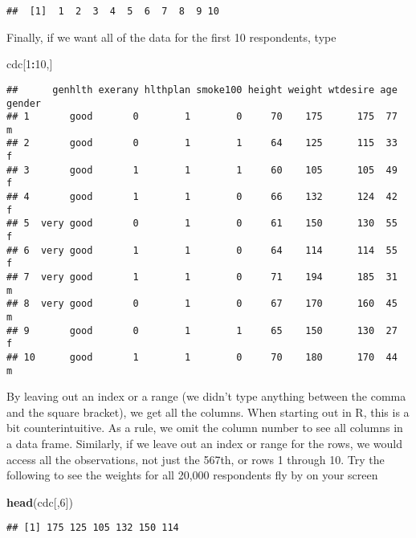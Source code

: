 \documentclass[]{article}
\newenvironment{Shaded}{\begin{snugshade}}{\end{snugshade}}
\newcommand{\KeywordTok}[1]{\textcolor[rgb]{0.13,0.29,0.53}{\textbf{#1}}}
\newcommand{\DecValTok}[1]{\textcolor[rgb]{0.00,0.00,0.81}{#1}}
\newcommand{\OperatorTok}[1]{\textcolor[rgb]{0.81,0.36,0.00}{\textbf{#1}}}
\newcommand{\NormalTok}[1]{#1}
\begin{document}
\begin{verbatim}
##  [1]  1  2  3  4  5  6  7  8  9 10
\end{verbatim}

Finally, if we want all of the data for the first 10 respondents, type

\begin{Shaded}
\begin{Highlighting}[]
\NormalTok{cdc[}\DecValTok{1}\OperatorTok{:}\DecValTok{10}\NormalTok{,]}
\end{Highlighting}
\end{Shaded}

\begin{verbatim}
##      genhlth exerany hlthplan smoke100 height weight wtdesire age gender
## 1       good       0        1        0     70    175      175  77      m
## 2       good       0        1        1     64    125      115  33      f
## 3       good       1        1        1     60    105      105  49      f
## 4       good       1        1        0     66    132      124  42      f
## 5  very good       0        1        0     61    150      130  55      f
## 6  very good       1        1        0     64    114      114  55      f
## 7  very good       1        1        0     71    194      185  31      m
## 8  very good       0        1        0     67    170      160  45      m
## 9       good       0        1        1     65    150      130  27      f
## 10      good       1        1        0     70    180      170  44      m
\end{verbatim}

By leaving out an index or a range (we didn't type anything between the
comma and the square bracket), we get all the columns. When starting out
in R, this is a bit counterintuitive. As a rule, we omit the column
number to see all columns in a data frame. Similarly, if we leave out an
index or range for the rows, we would access all the observations, not
just the 567th, or rows 1 through 10. Try the following to see the
weights for all 20,000 respondents fly by on your screen

\begin{Shaded}
\begin{Highlighting}[]
\KeywordTok{head}\NormalTok{(cdc[,}\DecValTok{6}\NormalTok{])}
\end{Highlighting}
\end{Shaded}

\begin{verbatim}
## [1] 175 125 105 132 150 114
\end{verbatim}
\end{document}
